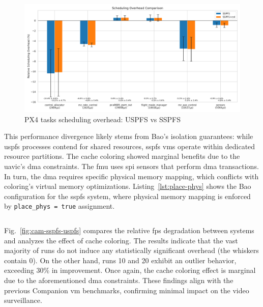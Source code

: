 \begin{figure}[!hbt]
  \centering
  \includegraphics[width=1.0\textwidth]{./img/pdf/px4-sspfs-uspfs} 
  \caption{PX4 tasks scheduling overhead: USPFS vs SSPFS}%
  \label{fig:px4-sspfs-uspfs}
\end{figure}

This performance divergence likely stems from Bao's isolation guarantees: while
\gls{uspfs} processes contend for shared resources, \gls{sspfs} \glspl{vm}
operate within dedicated resource partitions. The cache coloring showed marginal
benefits due to the \gls{uavic}'s \gls{dma} constraints. The \gls{fmu} uses
\gls{spi} sensors that perform \gls{dma} transactions. In turn, the \gls{dma}
requires specific physical memory mapping, which conflicts with coloring's virtual memory
optimizations. Listing~\ref{lst:place-phys} shows the Bao configuration for the
\gls{sspfs} system, where physical memory mapping is enforced by
\lstinline{place_phys = true} assignment.

\begin{longlisting}
\centering
\inputminted[]{bash}{./listing/placePhys.c}
\caption[Physical memory mapping in the SSPFS system]{Physical memory mapping
  in the \gls{sspfs} system: \lstinline{place_phys = true}}
\label{lst:place-phys}
\end{longlisting}

Fig.~\ref{fig:cam-sspfs-uspfs} compares the relative \gls{fps} degradation
between systems and analyzes the effect of cache coloring. The results indicate
that the vast majority of runs do not induce any statistically significant
overhead (the whiskers contain 0). On the other hand, runs 10 and 20 exhibit an
outlier behavior, exceeding 30\% in improvement. Once again, the cache coloring
effect is marginal due to the aforementioned \gls{dma} constraints.
These findings align with the previous Companion \gls{vm} benchmarks, confirming
minimal impact on the video surveillance.

